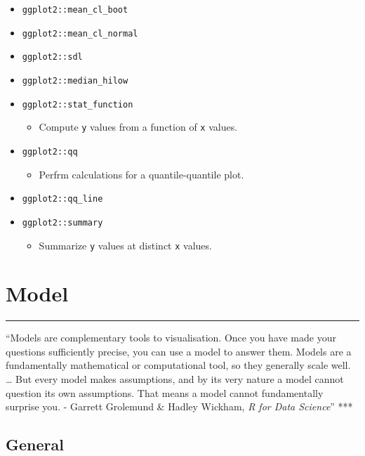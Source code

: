 \documentclass[
]{book}
\providecommand{\tightlist}{%
  \setlength{\itemsep}{0pt}\setlength{\parskip}{0pt}}
\begin{document}
\begin{itemize}
\tightlist
\item
  \texttt{ggplot2::mean\_cl\_boot}
\item
  \texttt{ggplot2::mean\_cl\_normal}
\item
  \texttt{ggplot2::sdl}
\item
  \texttt{ggplot2::median\_hilow}
\item
  \texttt{ggplot2::stat\_function}

  \begin{itemize}
  \tightlist
  \item
    Compute \texttt{y} values from a function of \texttt{x} values.
  \end{itemize}
\item
  \texttt{ggplot2::qq}

  \begin{itemize}
  \tightlist
  \item
    Perfrm calculations for a quantile-quantile plot.
  \end{itemize}
\item
  \texttt{ggplot2::qq\_line}
\item
  \texttt{ggplot2::summary}

  \begin{itemize}
  \tightlist
  \item
    Summarize \texttt{y} values at distinct \texttt{x} values.
  \end{itemize}
\end{itemize}

\hypertarget{model}{%
\chapter{Model}\label{model}}

\begin{center}\rule{0.5\linewidth}{0.5pt}\end{center}

``Models are complementary tools to visualisation. Once you have made your questions sufficiently precise, you can use a model to answer them. Models are a fundamentally mathematical or computational tool, so they generally scale well. \ldots{} But every model makes assumptions, and by its very nature a model cannot question its own assumptions. That means a model cannot fundamentally surprise you.
- Garrett Grolemund \& Hadley Wickham, \emph{R for Data Science}''
***

\hypertarget{general}{%
\section{General}\label{general}}
\end{document}
